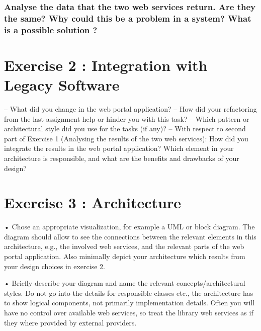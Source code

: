 \subsubsection{Analyse the data that the two web services return. Are they the same? Why
could this be a problem in a system? What is a possible solution ?}

\section{Exercise 2 : Integration with Legacy Software}

– What did you change in the web portal application?
– How did your refactoring from the last assignment help or hinder you with
this task?
– Which pattern or architectural style did you use for the tasks (if any)?
– With respect to second part of Exercise 1 (Analysing the results of the two
web services): How did you integrate the results in the web portal application?
Which element in your architecture is responsible, and what are the benefits
and drawbacks of your design?

\section{Exercise 3 : Architecture}

• Chose an appropriate visualization, for example a UML or block diagram. The
diagram should allow to see the connections between the relevant elements in this
architecture, e.g., the involved web services, and the relevant parts of the web
portal application. Also minimally depict your architecture which results from
your design choices in exercise 2.

• Briefly describe your diagram and name the relevant concepts/architectural styles.
Do not go into the details for responsible classes etc., the architecture has to show
logical components, not primarily implementation details. Often you will have no
control over available web services, so treat the library web services as if they where
provided by external providers.
